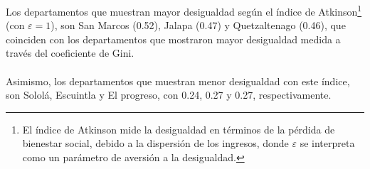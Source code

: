 Los departamentos que muestran mayor desigualdad según el índice de Atkinson\footnote{El índice de Atkinson mide la desigualdad en términos de la pérdida de bienestar social, debido a la dispersión de los ingresos, donde $\varepsilon$ se interpreta como un parámetro de aversión a la desigualdad.} (con $\varepsilon = \mbox{1}$), son San Marcos (0.52), Jalapa (0.47) y Quetzaltenago (0.46), que coinciden con los departamentos que mostraron mayor desigualdad  medida a través del coeficiente de Gini.\\\\
 Asimismo, los departamentos que muestran menor desigualdad con este índice, son Sololá, Escuintla y El progreso, con 0.24, 0.27 y 0.27, respectivamente. 